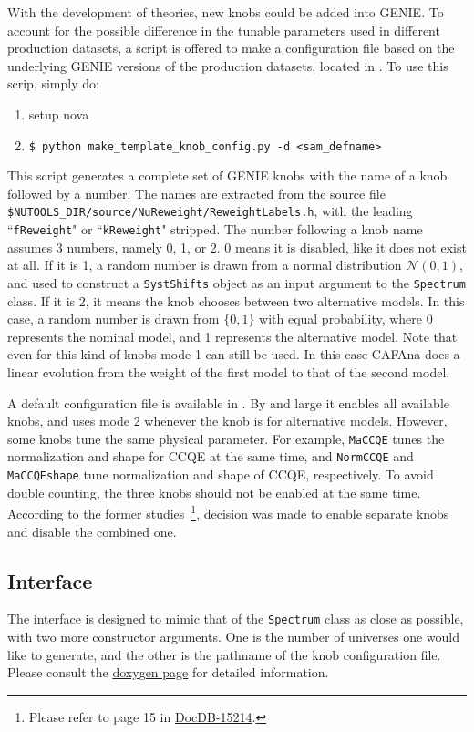 \documentclass[12pt,a4paper,final]{iopart}
\begin{document}
With the development of theories, new knobs could be added into GENIE. To account for the possible difference in the tunable parameters used in different production datasets, a script is offered to make a configuration file based on the underlying GENIE versions of the production datasets, located in . To use this scrip, simply do:
\begin{enumerate}
  \item setup nova
  \item \texttt{\$ python make\_template\_knob\_config.py -d \textless sam\_defname\textgreater}
\end{enumerate}
This script generates a complete set of GENIE knobs with the name of a knob followed by a number. The names are extracted from the source file \texttt{\$NUTOOLS\_DIR/source/NuReweight/ReweightLabels.h}, with the leading ``\texttt{fReweight}" or ``\texttt{kReweight}" stripped. The number following a knob name assumes 3 numbers, namely 0, 1, or 2. 0 means it is disabled, like it does not exist at all. If it is 1, a random number is drawn from a normal distribution $\mathcal{N}(0,1)$, and used to construct a \texttt{SystShifts} object as an input argument to the \texttt{Spectrum} class. If it is 2, it means the knob chooses between two alternative models. In this case, a random number is drawn from $\{0,1\}$ with equal probability, where 0 represents the nominal model, and 1 represents the alternative model. Note that even for this kind of knobs mode 1 can still be used. In this case CAFAna does a linear evolution from the weight of the first model to that of the second model.

A default configuration file is available in . By and large it enables all available knobs, and uses mode 2 whenever the knob is for alternative models. However, some knobs tune the same physical parameter. For example, \texttt{MaCCQE} tunes the normalization and shape for CCQE at the same time, and \texttt{NormCCQE} and \texttt{MaCCQEshape} tune normalization and shape of CCQE, respectively. To avoid double counting, the three knobs should not be enabled at the same time. According to the former studies~\footnote{Please refer to page 15 in \href{https://nova-docdb.fnal.gov:441/cgi-bin/ShowDocument?docid=15214}{DocDB-15214}.}, decision was made to enable separate knobs and disable the combined one.

\subsection{Interface}
The interface is designed to mimic that of the \texttt{Spectrum} class as close as possible, with two more constructor arguments. One is the number of universes one would like to generate, and the other is the pathname of the knob configuration file. Please consult the \href{http://nusoft.fnal.gov/nova/novasoft/doxygen/html/classana_1_1MultiverseSpectra.html}{doxygen page} for detailed information.
\end{document}
